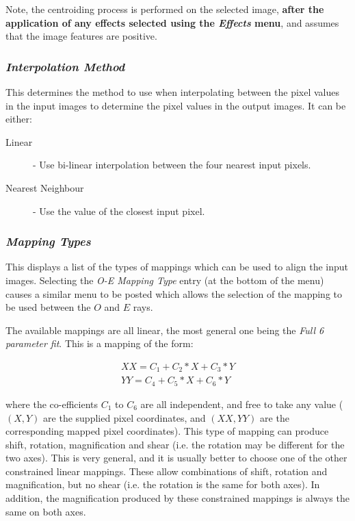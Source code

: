 \documentclass[11pt]{article}
\newcommand{\htmlref}[2]{#1}
\newcommand{\xlabel}[1]{}
\newcommand{\mylabel}[1] {\xlabel{#1}\label{#1}}
\begin{document}
Note, the centroiding process is performed on the selected image, {\bf
after the application of any effects selected using the \htmlref{{\em
Effects}}{POLKA_EFFECTS_MENU} menu}, and assumes that the image features
are positive.

\subsubsection {\mylabel{POLKA_INTERPOLATION_METHOD}\emph{Interpolation Method}}
This determines the method to use when interpolating between the pixel
values in the input images to determine the pixel values in the output
images. It can be either:

\begin{description}
\item [Linear] - Use bi-linear interpolation between the four nearest
input pixels.
\item [Nearest Neighbour] - Use the value of the closest input pixel.
\end{description}

\subsubsection {\mylabel{POLKA_MAP_TYPES}\emph{Mapping Types}} This displays a
list of the types of mappings which can be used to align the input
images. Selecting the \emph{O-E Mapping Type} entry (at the bottom of the
menu) causes a similar menu to be posted which allows the selection of
the mapping to be used between the $O$ and $E$ rays.

The available mappings are all linear, the most general one being the
\emph{Full 6 parameter fit}. This is a mapping of the form:

\begin{eqnarray*}
XX = C_{1} + C_{2}*X + C_{3}*Y \\
YY = C_{4} + C_{5}*X + C_{6}*Y
\end{eqnarray*}

where the co-efficients $C_{1}$ to $C_{6}$ are all independent, and free
to take any value ($(X,Y)$ are the supplied pixel coordinates, and
$(XX,YY)$ are the corresponding mapped pixel coordinates). This type of
mapping can produce shift, rotation, magnification and shear (i.e. the
rotation may be different for the two axes). This is very general,
and it is usually better to choose one of the other constrained linear
mappings. These allow
combinations of shift, rotation and magnification, but no shear (i.e. the
rotation is the same for both axes). In addition, the magnification
produced by these constrained mappings is always the same on both axes.
\end{document}
